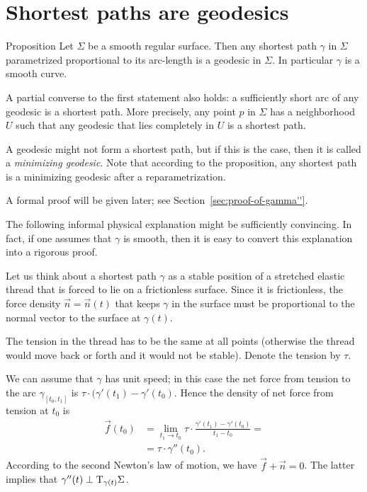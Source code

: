 \section{Shortest paths are geodesics}

\begin{thm}{Proposition}\label{prop:gamma''}
Let $\Sigma$ be a smooth regular surface.
Then any shortest path $\gamma$ in $\Sigma$ parametrized proportional to its arc-length is a geodesic in $\Sigma$.
In particular $\gamma$ is a smooth curve.

A partial converse to the first statement also holds: a sufficiently short arc of any geodesic is a shortest path.
More precisely, any point $p$ in $\Sigma$ has a neighborhood $U$ such that any geodesic that lies completely in $U$ is a shortest path.
\end{thm}

A geodesic might not form a shortest path, but if this is the case, then it is called a \emph{minimizing geodesic}.
Note that according to the proposition, any shortest path is a minimizing geodesic after a reparametrization.

A formal proof will be given later; see Section~\ref{sec:proof-of-gamma''}.

The following informal physical explanation might be sufficiently convincing.
In fact, if one assumes that $\gamma$ is smooth, then it is easy to convert this explanation into a rigorous proof.

Let us think about a shortest path $\gamma$ as a stable position of a stretched elastic thread that is forced to lie on a frictionless surface.
Since it is frictionless, the force density $\vec n=\vec n(t)$ that keeps $\gamma$ in the surface must be proportional to the normal vector to the surface at $\gamma(t)$.

The tension in the thread has to be the same at all points (otherwise the thread would move back or forth and it would not be stable).
Denote the tension by $\tau$.

We can assume that $\gamma$ has unit speed;
in this case the net force from tension to the arc $\gamma_{[t_0,t_1]}$ is $\tau\cdot(\gamma'(t_1)-\gamma'(t_0)$.
Hence the density of net force from tension at $t_0$ is 
\begin{align*}
\vec f(t_0)&=\lim_{t_1\to t_0}\tau\cdot\frac{\gamma'(t_1)-\gamma'(t_0)}{t_1-t_0}=
\\
&=\tau\cdot\gamma''(t_0).
\end{align*}
According to the second Newton's law of motion, we have 
$\vec f+\vec n=0$.
The latter implies that  $\gamma''(t)\perp\mathrm{T}_{\gamma(t)}\Sigma$.
\qeds


